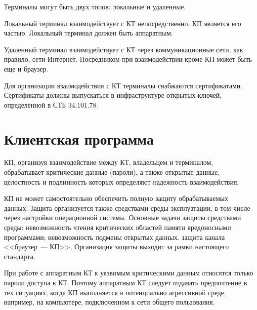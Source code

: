 Терминалы могут быть двух типов: локальные и удаленные.

Локальный терминал взаимодействует с КТ непосредственно. КП является 
его частью. Локальный терминал должен быть аппаратным.

Удаленный терминал взаимодействует с КТ через коммуникационные сети,
как правило, сети Интернет. Посредником при взаимодействии 
кроме КП может быть еще и браузер. 

Для организации взаимодействия с КТ терминалы снабжаются сертификатами.
Сертификаты должны выпускаться в инфраструктуре открытых ключей, 
определенной в СТБ 34.101.78.

\section{Клиентская программа}

КП, организуя взаимодействие между КТ, владельцем и терминалом,
обрабатывает критические данные (пароли), а также открытые данные, 
целостность и подлинность которых определяют надежность  
взаимодействия.

КП не может самостоятельно 
обеспечить полную защиту обрабатываемых данных. 
Защита организуется также средствами среды эксплуатации, 
в том числе через настройки операционной системы.  
%
Основные задачи защиты средствами среды: 
невозможность чтения критических областей памяти вредоносными программами; 
невозможность подмены открытых данных.
защита канала <<браузер~--- КП>>.
%
Организация защиты выходит за рамки настоящего стандарта.

При работе с аппаратным КТ к уязвимым критическими данным
относятся только пароли доступа к КТ. Поэтому аппаратным КТ следует отдавать 
предпочтение в тех ситуациях, когда КП выполняется в потенциально агрессивной 
среде, например, на компьютере, подключенном к сети общего пользования.






